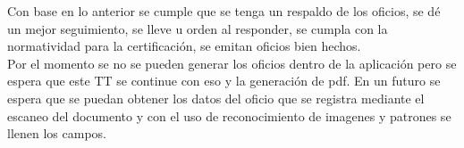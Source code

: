 Con base en lo anterior se cumple que se tenga un respaldo de los oficios, se dé un mejor seguimiento, se lleve u orden al responder, se cumpla con la normatividad para la certificación, se emitan oficios bien hechos. \\

Por el momento se no se pueden generar los oficios dentro de la aplicación pero se espera que este TT se continue con eso y la generación de pdf. En un futuro se espera que se puedan obtener los datos del oficio que se registra mediante el escaneo del documento y con el uso de reconocimiento de imagenes y patrones se llenen los campos. 

